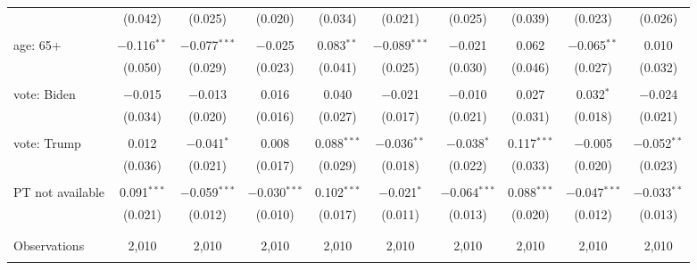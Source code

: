 \begin{tabular}{@{\extracolsep{5pt}}lccccccccc}
  & (0.042) & (0.025) & (0.020) & (0.034) & (0.021) & (0.025) & (0.039) & (0.023) & (0.026) \\ 
  & & & & & & & & & \\ 
 age: 65+ & $-$0.116$^{**}$ & $-$0.077$^{***}$ & $-$0.025 & 0.083$^{**}$ & $-$0.089$^{***}$ & $-$0.021 & 0.062 & $-$0.065$^{**}$ & 0.010 \\ 
  & (0.050) & (0.029) & (0.023) & (0.041) & (0.025) & (0.030) & (0.046) & (0.027) & (0.032) \\ 
  & & & & & & & & & \\ 
 vote: Biden & $-$0.015 & $-$0.013 & 0.016 & 0.040 & $-$0.021 & $-$0.010 & 0.027 & 0.032$^{*}$ & $-$0.024 \\ 
  & (0.034) & (0.020) & (0.016) & (0.027) & (0.017) & (0.021) & (0.031) & (0.018) & (0.021) \\ 
  & & & & & & & & & \\ 
 vote: Trump & 0.012 & $-$0.041$^{*}$ & 0.008 & 0.088$^{***}$ & $-$0.036$^{**}$ & $-$0.038$^{*}$ & 0.117$^{***}$ & $-$0.005 & $-$0.052$^{**}$ \\ 
  & (0.036) & (0.021) & (0.017) & (0.029) & (0.018) & (0.022) & (0.033) & (0.020) & (0.023) \\ 
  & & & & & & & & & \\ 
 PT not available & 0.091$^{***}$ & $-$0.059$^{***}$ & $-$0.030$^{***}$ & 0.102$^{***}$ & $-$0.021$^{*}$ & $-$0.064$^{***}$ & 0.088$^{***}$ & $-$0.047$^{***}$ & $-$0.033$^{**}$ \\ 
  & (0.021) & (0.012) & (0.010) & (0.017) & (0.011) & (0.013) & (0.020) & (0.012) & (0.013) \\ 
  & & & & & & & & & \\ 
\hline \\[-1.8ex] 

Observations & 2,010 & 2,010 & 2,010 & 2,010 & 2,010 & 2,010 & 2,010 & 2,010 & 2,010 \\ 
\hline 
\hline \\[-1.8ex] 
\end{tabular} 